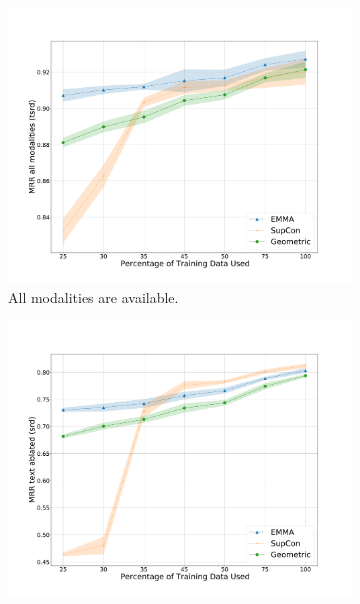\documentclass[sigconf,natbib=true,anonymous=true]{acmart}
\begin{document}
\begin{figure}
    \centering
    \begin{subfigure}[b]{0.49\columnwidth}
        \centering
        \includegraphics[width=\columnwidth]{Figures/average-seeds-converged-partial-train-mrr_lard-trimmed.pdf}
        \caption[]{All modalities are available.}    
        \label{fig:partial-mrr.lard}
    \end{subfigure}
    \hfill
    \begin{subfigure}[b]{0.49\columnwidth}  
        \centering 
        \includegraphics[width=\columnwidth]{Figures/average-seeds-converged-partial-train-mrr_ard-trimmed.pdf}

\end{subfigure}
\end{figure}
\end{document}
